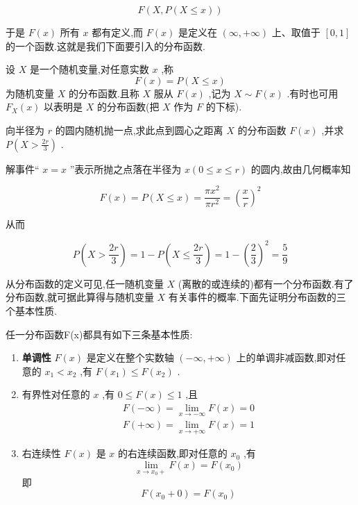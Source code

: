 \[
F(X,P(X\leq x))
\]

于是 $ F(x) $ 所有 $ x $ 都有定义,而 $ F(x) $ 是定义在 $ (\infty,+\infty ) $ 上、取值于 $ [0,1] $ 的一个函数.这就是我们下面要引入的分布函数.

\begin{definition}{}{}
	设 $ X $ 是一个随机变量,对任意实数 $ x $ ,称
	\begin{equation} 
	F(x)=P(X \leqslant x) \label{2.1.1}
	\end{equation}
	为随机变量 $ X $ 的分布函数.且称 $ X $ 服从 $ F(x) $ ,记为 $ X\sim F(x) $ .有时也可用 $ F_{X}(x) $ 以表明是 $ X $ 的分布函数(把 $ X $ 作为 $ F $ 的下标).
\end{definition}

\begin{example}
	向半径为 $ r $ 的圆内随机抛一点,求此点到圆心之距离 $ X $ 的分布函数 $ F(x) $ ,并求 $ P\left(X>\frac{2 r}{3}\right) $ .
	
	解事件“ $ x=x $ ”表示所抛之点落在半径为 $ x(0 \leqslant x \leqslant r) $ 的圆内,故由几何概率知
	
	\[ 
	F(x)=P(X \leqslant x)=\frac{\pi x^{2}}{\pi r^{2}}=\left(\frac{x}{r}\right)^{2}
	\]
	
	从而
	
	\[ 
	P\left(X>\frac{2 r}{3}\right)=1-P\left(X \leqslant \frac{2 r}{3}\right)=1-\left(\frac{2}{3}\right)^{2}=\frac{5}{9}
	\]
	
	
\end{example}


从分布函数的定义可见,任一随机变量 $ X $ (离散的或连续的)都有一个分布函数.有了分布函数,就可据此算得与随机变量 $ X $ 有关事件的概率.下面先证明分布函数的三个基本性质.

\begin{theorem}{}{}
	任一分布函数F(x)都具有如下三条基本性质:
	\begin{enumerate}
		\item \textbf{单调性} $ F(x) $ 是定义在整个实数轴 $ (-\infty,+\infty ) $ 上的单调非减函数,即对任意的 $ x_1<x_2 $ ,有 $ F(x_1)\leq F(x_2) $ .
		\item 有界性对任意的 $ x $ ,有 $ 0\leq F(x)\leq 1 $ ,且
		\[ 
		\begin{array}{l}{F(-\infty)=\lim _{x \rightarrow-\infty} F(x)=0} \\ {F(+\infty)=\lim _{x \rightarrow+\infty} F(x)=1}\end{array}
		\]
		
		\item 右连续性 $ F(x) $ 是 $ x $ 的右连续函数,即对任意的 $ x_0 $ ,有
		\[ 
		\lim _{x \rightarrow x_{0}+} F(x)=F\left(x_{0}\right)
		\]
		即
		\[ 
		F\left(x_{0}+0\right)=F\left(x_{0}\right)
		\]
	\end{enumerate}
\end{theorem}

